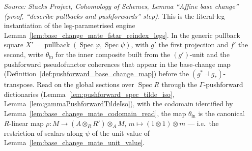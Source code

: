 \begin{lemma}

  \label{lem:base_change_mate_fstar_reindex}
  \textit{Source: Stacks Project, Cohomology of Schemes, Lemma ``Affine base change''
  (proof, ``describe pullbacks and pushforwards'' step).}
  This is the literal-leg instantiation of the leg-parametrised engine
  Lemma~\ref{lem:base_change_mate_fstar_reindex_legs}.
  In the generic pullback square \(X' = \operatorname{pullback}(\operatorname{Spec}\varphi,
  \operatorname{Spec}\psi)\), with \(g'\) the first projection and \(f'\) the second,
  write \(\theta_{\mathrm{in}}\) for the inner composite built from the \((g')\)-unit and
  the pushforward pseudofunctor coherences that appear in the base-change map
  (Definition~\ref{def:pushforward_base_change_map}) before the
  \((g^* \dashv g_*)\)-transpose.
  Read on the global sections over \(\operatorname{Spec} R\) through the \(\Gamma\)-pushforward
  dictionaries (Lemma~\ref{lem:pushforward_spec_tilde_iso},
  Lemma~\ref{lem:gammaPushforwardTildeIso}), with the codomain identified by
  Lemma~\ref{lem:base_change_mate_codomain_read}, the map \(\theta_{\mathrm{in}}\) is
  the canonical \(R\)-linear map \(\rho : M \to (A \otimes_R R') \otimes_A M\),
  \(m \mapsto (1 \otimes 1) \otimes m\) — i.e.\ the restriction of scalars along \(\psi\)
  of the unit value of Lemma~\ref{lem:base_change_mate_unit_value}.
\end{lemma}
